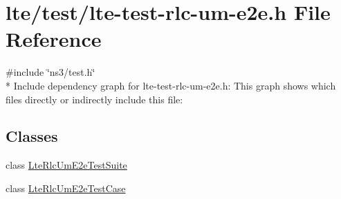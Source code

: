 \hypertarget{lte-test-rlc-um-e2e_8h}{}\section{lte/test/lte-\/test-\/rlc-\/um-\/e2e.h File Reference}
\label{lte-test-rlc-um-e2e_8h}
{\ttfamily \#include \char`\"{}ns3/test.\+h\char`\"{}}\\*
Include dependency graph for lte-\/test-\/rlc-\/um-\/e2e.h\+:
This graph shows which files directly or indirectly include this file\+:
\subsection*{Classes}
\begin{DoxyCompactItemize}
\item 
class \hyperlink{classLteRlcUmE2eTestSuite}{Lte\+Rlc\+Um\+E2e\+Test\+Suite}
\item 
class \hyperlink{classLteRlcUmE2eTestCase}{Lte\+Rlc\+Um\+E2e\+Test\+Case}
\end{DoxyCompactItemize}

